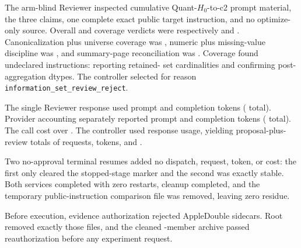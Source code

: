 The arm-blind Reviewer inspected cumulative Quant-$H_0$-to-c2 prompt material,
the three claims, one complete exact public target instruction, and no
optimize-only source. Overall and coverage verdicts were respectively
\HoldingsRefineReviewOverall{} and \HoldingsRefineReviewCoverage{}.
Canonicalization plus universe coverage was
\HoldingsRefineReviewCanonicalization{}, numeric plus missing-value discipline
was \HoldingsRefineReviewNumeric{}, and summary-page reconciliation was
\HoldingsRefineReviewReconciliation{}. Coverage found
\HoldingsRefineReviewUndeclared{} undeclared instructions: reporting retained-
set cardinalities and confirming post-aggregation dtypes. The controller
selected \HoldingsRefineDecision{} for reason
\texttt{information\_set\_review\_reject}.

The single Reviewer response used \HoldingsRefineReviewResponsePrompt{} prompt
and \HoldingsRefineReviewResponseCompletion{} completion tokens
(\HoldingsRefineReviewResponseTokens{} total). Provider accounting separately
reported \HoldingsRefineReviewProviderPrompt{} prompt and
\HoldingsRefineReviewProviderCompletion{} completion tokens
(\HoldingsRefineReviewProviderTokens{} total). The call cost
\HoldingsRefineReviewCost{} over \HoldingsRefineReviewWall{}. The controller
used response usage, yielding proposal-plus-review totals of
\HoldingsRefineCumulativeRequests{} requests,
\HoldingsRefineCumulativeTokens{} tokens, and
\HoldingsRefineCumulativeCost{}.

Two no-approval terminal resumes added no dispatch, request, token, or cost:
the first only cleared the stopped-stage marker and the second was exactly
stable. Both services completed with zero restarts, cleanup completed, and the
temporary public-instruction comparison file was removed, leaving zero
residue. 

 Before execution, evidence
authorization rejected \HoldingsRefineRfourPreflightSidecars{} AppleDouble
sidecars. Root removed exactly those files, and the cleaned
\HoldingsRefineRfourAuthorizedMembers{}-member archive passed reauthorization
before any experiment request.

